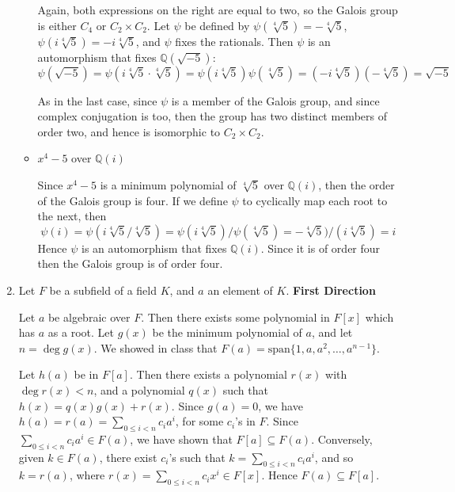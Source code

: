 \documentclass[11pt]{article} \usepackage{amssymb}
\newcommand{\Q}{\mathbb Q}
\begin{document}
\begin{enumerate}
\begin{itemize}
      Again, both expressions on the right are equal to two, so the Galois
      group is either $C_4$ or $C_2\times C_2$. Let $\psi$ be defined by 
      $\psi(\sqrt[4]{5})=-\sqrt[4]{5}$, $\psi(i\sqrt[4]{5})=-i\sqrt[4]{5}$,
      and $\psi$ fixes the rationals. Then $\psi$ is an automorphism that
      fixes $\Q(\sqrt{-5})$:
      \begin{equation*}
        \psi(\sqrt{-5})=\psi(i\sqrt[4]{5}\cdot\sqrt[4]{5})
        = \psi(i\sqrt[4]{5})\psi(\sqrt[4]{5})
        = (-i\sqrt[4]{5})(-\sqrt[4]{5})=\sqrt{-5}
      \end{equation*}
      
      As in the last case, since $\psi$ is a member of the Galois group, and 
      since complex 
      conjugation is too, then the group has two distinct members of order
      two, and hence is isomorphic to $C_2\times C_2$.
      
    \item $x^4-5$ over $\Q(i)$

      Since $x^4-5$ is a minimum polynomial of $\sqrt[4]{5}$ over $\Q(i)$, then 
      the order of the Galois group is four.
      If we define $\psi$ to cyclically map each root to the next, then
      \begin{equation*}
        \psi(i)=\psi(i\sqrt[4]{5}/\sqrt[4]{5})
        =\psi(i\sqrt[4]{5})/\psi(\sqrt[4]{5})
        =-\sqrt[4]{5})/(i\sqrt[4]{5})
        =i
      \end{equation*}
      Hence $\psi$ is an automorphism that fixes $\Q(i)$. Since it is of order
      four then the Galois group is of order four.

    \end{itemize}  

  \item
    Let $F$ be a subfield of a field $K$, and $a$ an element of $K$.
    {\bf First Direction}

    Let $a$ be algebraic over $F$. Then there exists some polynomial in $F[x]$
    which has $a$ as a root. Let $g(x)$ be the minimum polynomial of $a$, and
    let $n=\deg g(x)$. 
    We showed in class that $F(a)=\mbox{span}\{1, a, a^2, \ldots, a^{n-1}\}$. 
    
    Let $h(a)$ be in $F[a]$. 
    Then there exists a polynomial
    $r(x)$ with $\deg r(x) < n$, and a polynomial $q(x)$ such that 
    $h(x)=q(x)g(x)+r(x)$. Since $g(a)=0$, we have 
    $h(a)=r(a)=\sum_{0\leq i <n}c_ia^i$, for some $c_i$'s in $F$. Since
    $\sum_{0\leq i <n}c_ia^i \in F(a)$, we have shown that $F[a] \subseteq F(a)$. 
    Conversely, given $k \in F(a)$, there exist $c_i$'s such that $k=\sum_{0\leq i <n}c_ia^i$,
    and so $k=r(a)$, where $r(x)=\sum_{0\leq i <n}c_ix^i \in F[x]$. 
    Hence $F(a) \subseteq F[a]$.


\end{enumerate}
\end{document}
